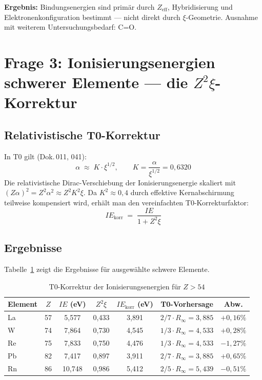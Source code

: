\textbf{Ergebnis:} Bindungsenergien sind primär durch $Z_\mathrm{eff}$,
Hybridisierung und Elektronenkonfiguration bestimmt — nicht direkt durch
$\xi$-Geometrie. Ausnahme mit weiterem Untersuchungsbedarf: C=O.

\section{Frage 3: Ionisierungsenergien schwerer Elemente — die \texorpdfstring{$Z^2\xi$}{Z²ξ}-Korrektur}
\label{sec:schwere-elemente}

\subsection{Relativistische T0-Korrektur}
\label{subsec:rel-korrektur}

In T0 gilt (Dok.\,011, 041):
\begin{equation}
  \alpha \;\approx\; K \cdot \xi^{1/2}, \qquad K = \frac{\alpha}{\xi^{1/2}} = 0{,}6320
\end{equation}
Die relativistische Dirac-Verschiebung der Ionisierungsenergie skaliert mit
$(Z\alpha)^2 = Z^2 \alpha^2 \approx Z^2 K^2 \xi$.
Da $K^2 \approx 0{,}4$ durch effektive Kernabschirmung teilweise kompensiert
wird, erhält man den vereinfachten T0-Korrekturfaktor:
\begin{equation}
  \boxed{IE_\mathrm{korr} \;=\; \frac{IE}{1 + Z^2 \xi}}
  \label{eq:IE-korr}
\end{equation}

\subsection{Ergebnisse}
\label{subsec:ergebnisse-schwer}

Tabelle~\ref{tab:schwere-elemente} zeigt die Ergebnisse für ausgewählte
schwere Elemente.

\begin{table}[htbp]
\centering
\caption{T0-Korrektur der Ionisierungsenergien für $Z > 54$}
\label{tab:schwere-elemente}
\begin{tabular}{lcccccc}
\hline
Element & $Z$ & $IE$ (eV) & $Z^2\xi$ & $IE_\mathrm{korr}$ (eV) & T0-Vorhersage & Abw. \\
\hline
La & 57 & 5{,}577 & 0{,}433 & 3{,}891 & $2/7 \cdot R_\infty = 3{,}885$ & $+0{,}16\%$ \\
W  & 74 & 7{,}864 & 0{,}730 & 4{,}545 & $1/3 \cdot R_\infty = 4{,}533$ & $+0{,}28\%$ \\
Re & 75 & 7{,}833 & 0{,}750 & 4{,}476 & $1/3 \cdot R_\infty = 4{,}533$ & $-1{,}27\%$ \\
Pb & 82 & 7{,}417 & 0{,}897 & 3{,}911 & $2/7 \cdot R_\infty = 3{,}885$ & $+0{,}65\%$ \\
Rn & 86 & 10{,}748& 0{,}986 & 5{,}412 & $2/5 \cdot R_\infty = 5{,}439$ & $-0{,}51\%$ \\
\hline
\end{tabular}
\end{table}

